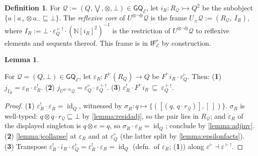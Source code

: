 \documentclass{article}
\makeatletter
\newcommand{\allproofs}{} %
\newif\ifproofsinappendix
\newcommand{\lemmawithproof}[3]{%
  \begin{lemma}\label{#1}
    #2  
    \ifproofsinappendix \hyperref[xxx#1]{(Proof)} \fi
  \end{lemma}
    \ifproofsinappendix
  \g@addto@macro\allproofs{%
    \par\medskip
    \noindent
    \subsection*{\cref{#1}}\par
    #2\par
    \begin{proof}\label{xxx#1}
      #3
    \end{proof}%
  }
      \else

    \begin{proof}
      #3
    \end{proof}
    \fi 
}
\theoremstyle{definition}
\newtheorem{definition}{Definition}[section]
\newtheorem{lemma}{Lemma}[section]
\newcommand{\N}{\mathbb{N}}
\newcommand{\cE}{\mathcal{E}}
\newcommand{\cQ}{\mathcal{Q}}
\newcommand{\cat}[1]{\mathsf{#1}}
\newcommand{\id}{\operatorname{id}}
\makeatother
\begin{document}
\begin{definition}\label{def:reflcore}
For $\cQ:=(Q,\bigvee,\otimes,\bot)\in\cat{GQ}_\cE$, let $i_R\colon R_\cQ\rightarrowtail Q^2$ be the subobject
$\{a\mid a_+\otimes a_-\sqsubseteq\bot\}$. 
The \emph{reflexive core} of $U^{\otimes\neg\oplus}\cQ$ is the frame $U_\pm\cQ:=(R_\cQ,\ I_R)$, where
$I_R:=\bot\cdot \varepsilon^{\vdash!}_Q \cdot (\N[i_R]^2)^{-1}$ is the restriction of $U^{\otimes\neg\oplus}\cQ$ to reflexive elements and sequents thereof. 
This frame is in $\cat{IF^r_\cE}$ by construction.
\end{definition}

\lemmawithproof{lemma:epsR}{
For $\cQ=(Q,\bot)\in\cat{GQ}_\cE$, let
$\varepsilon_R\colon F^\vdash(R_Q)\to Q$ be  $F^\vdash i_R\cdot\varepsilon^\vdash_Q$. Then:
({\bf 1}) $j_{I_R}=\varepsilon_R\cdot\varepsilon_R^!$. ({\bf 2})
$j_{U^{\otimes\neg\oplus} \cQ}=\varepsilon^\vdash_Q\cdot\varepsilon^{\vdash!}_Q$. 
({\bf 3}) $\varepsilon_R^!\cdot F^\vdash i_R\ \sqsubseteq\ \varepsilon^{\vdash!}_Q$.
}{
({\bf 1}) $\varepsilon_R^!\cdot\varepsilon_R=\id_Q$, witnessed by
$\sigma_R\colon q\mapsto\{([(q,\,q\cdot r_\cQ)],[\ ])\}$. $\sigma_R$ is well-typed: $q\otimes q\cdot r_\cQ\sqsubseteq\bot$ by
\cref{lemma:residadj}, so the pair lies in $R_\cQ$; and $\dot\varepsilon_R$ of the displayed singleton is $q\otimes e=q$, so $\sigma_R\cdot\varepsilon_R=\id_Q$; conclude by
\cref{lemma:adjinv}.
({\bf 2}) \cref{lemma:jcollapse} at $\varepsilon_R$ and at $\varepsilon^\vdash_Q$ (the latter split by \cref{lemma:epsilonfacts}).
({\bf 3}) Transpose $\varepsilon_R^!\cdot\bar\iota_R\cdot\varepsilon^\vdash_Q =\varepsilon_R^!\cdot\varepsilon_R=\id_Q$ (defn.\ of $\varepsilon_R$; ({\bf 1})) along $\varepsilon^\vdash\dashv\varepsilon^{\vdash!}$.
}
\end{document}
